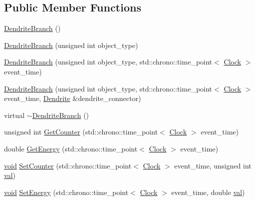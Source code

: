 \subsection*{Public Member Functions}
\begin{DoxyCompactItemize}
\item 
\mbox{\hyperlink{class_dendrite_branch_af391f5fd2379539523b3d2523c59ea8b}{Dendrite\+Branch}} ()
\item 
\mbox{\hyperlink{class_dendrite_branch_a391ba1440a6c29a0752b03eb60357370}{Dendrite\+Branch}} (unsigned int object\+\_\+type)
\item 
\mbox{\hyperlink{class_dendrite_branch_a390bfee680074f5f3ddcd9aee54db679}{Dendrite\+Branch}} (unsigned int object\+\_\+type, std\+::chrono\+::time\+\_\+point$<$ \mbox{\hyperlink{universe_8h_a0ef8d951d1ca5ab3cfaf7ab4c7a6fd80}{Clock}} $>$ event\+\_\+time)
\item 
\mbox{\hyperlink{class_dendrite_branch_a9b7e932b0614dad370edd76f31900c40}{Dendrite\+Branch}} (unsigned int object\+\_\+type, std\+::chrono\+::time\+\_\+point$<$ \mbox{\hyperlink{universe_8h_a0ef8d951d1ca5ab3cfaf7ab4c7a6fd80}{Clock}} $>$ event\+\_\+time, \mbox{\hyperlink{class_dendrite}{Dendrite}} \&dendrite\+\_\+connector)
\item 
virtual \mbox{\hyperlink{class_dendrite_branch_a38707cb6d1f9f07c6e8aa34a8a415051}{$\sim$\+Dendrite\+Branch}} ()
\item 
unsigned int \mbox{\hyperlink{class_dendrite_branch_a4d4a4b1591dd612eef903d95605d50fd}{Get\+Counter}} (std\+::chrono\+::time\+\_\+point$<$ \mbox{\hyperlink{universe_8h_a0ef8d951d1ca5ab3cfaf7ab4c7a6fd80}{Clock}} $>$ event\+\_\+time)
\item 
double \mbox{\hyperlink{class_dendrite_branch_afab2dd907fba115c3483cd9a217ccec0}{Get\+Energy}} (std\+::chrono\+::time\+\_\+point$<$ \mbox{\hyperlink{universe_8h_a0ef8d951d1ca5ab3cfaf7ab4c7a6fd80}{Clock}} $>$ event\+\_\+time)
\item 
\mbox{\hyperlink{glad_8h_a950fc91edb4504f62f1c577bf4727c29}{void}} \mbox{\hyperlink{class_dendrite_branch_a2ce03fbad4a70564eeaafb62debd4d74}{Set\+Counter}} (std\+::chrono\+::time\+\_\+point$<$ \mbox{\hyperlink{universe_8h_a0ef8d951d1ca5ab3cfaf7ab4c7a6fd80}{Clock}} $>$ event\+\_\+time, unsigned int \mbox{\hyperlink{glad_8h_a26942fd2ed566ef553eae82d2c109c8f}{val}})
\item 
\mbox{\hyperlink{glad_8h_a950fc91edb4504f62f1c577bf4727c29}{void}} \mbox{\hyperlink{class_dendrite_branch_a13dd0373022d653448c9067d075586a8}{Set\+Energy}} (std\+::chrono\+::time\+\_\+point$<$ \mbox{\hyperlink{universe_8h_a0ef8d951d1ca5ab3cfaf7ab4c7a6fd80}{Clock}} $>$ event\+\_\+time, double \mbox{\hyperlink{glad_8h_a26942fd2ed566ef553eae82d2c109c8f}{val}})

\end{DoxyCompactItemize}
